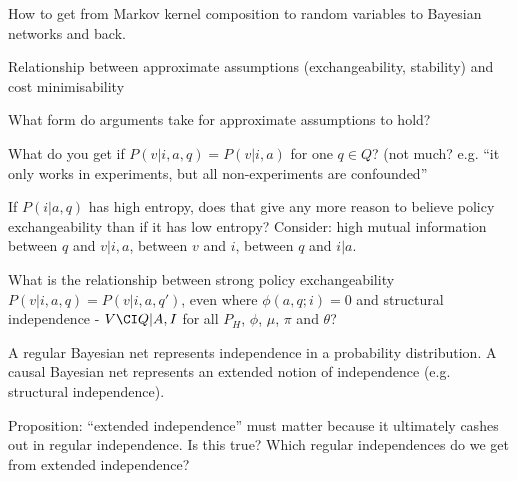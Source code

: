 \begin{question}
    How to get from Markov kernel composition to random variables to Bayesian networks and back.
\end{question}

\begin{question}
    Relationship between approximate assumptions (exchangeability, stability) and cost minimisability
\end{question}

\begin{question}
    What form do arguments take for approximate assumptions to hold?
\end{question}

\begin{question}
    What do you get if $P(v|i,a,q)=P(v|i,a)$ for one $q\in Q$? (not much? e.g. ``it only works in experiments, but all non-experiments are confounded''
\end{question}

\begin{question}
    If $P(i|a,q)$ has high entropy, does that give any more reason to believe policy exchangeability than if it has low entropy? Consider: high mutual information between $q$ and $v|i,a$, between $v$ and $i$, between $q$ and $i|a$.
\end{question}

\begin{question}
    What is the relationship between strong policy exchangeability $P(v|i,a,q)=P(v|i,a,q')$, even where $\phi(a,q;i)=0$ and structural independence  - $V\CI Q| A,I$ for all $P_H$, $\phi$, $\mu$, $\pi$ and $\theta$?
\end{question}

\begin{question}
    A regular Bayesian net represents independence in a probability distribution. A causal Bayesian net represents an extended notion of independence (e.g. structural independence). 
    
    Proposition: ``extended independence'' must matter because it ultimately cashes out in regular independence. Is this true? Which regular independences do we get from extended independence?
\end{question}